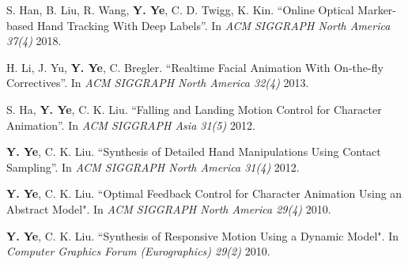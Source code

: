 \documentclass[margin,line]{res}
\begin{document}
\begin{resume}
\vspace*{-.1in}
S. Han, B. Liu, R. Wang, {\bf Y. Ye}, C. D. Twigg, K. Kin. ``Online Optical Marker-based Hand Tracking With Deep Labels''. In {\em ACM SIGGRAPH North America 37(4)} 2018.





\vspace*{-.1in}
H. Li, J. Yu, {\bf Y. Ye}, C. Bregler. ``Realtime Facial Animation With On-the-fly Correctives''. In {\em ACM SIGGRAPH North America 32(4)} 2013.


\vspace*{-.1in}
S. Ha, {\bf Y. Ye}, C. K. Liu. ``Falling and Landing Motion Control for Character Animation''. In {\em ACM SIGGRAPH Asia 31(5)} 2012.

\vspace*{-.1in}
{\bf Y. Ye}, C. K. Liu. ``Synthesis of Detailed Hand Manipulations Using Contact Sampling''. In {\em ACM SIGGRAPH North America 31(4)} 2012.

\vspace*{-.1in}
{\bf Y. Ye}, C. K. Liu. ``Optimal Feedback Control for Character Animation Using an Abstract Model". In {\em ACM SIGGRAPH North America 29(4)} 2010.

\vspace*{-.1in}
{\bf Y. Ye}, C. K. Liu. ``Synthesis of Responsive Motion Using a Dynamic Model". In {\em Computer Graphics Forum (Eurographics) 29(2)} 2010.


\end{resume}
\end{document}

